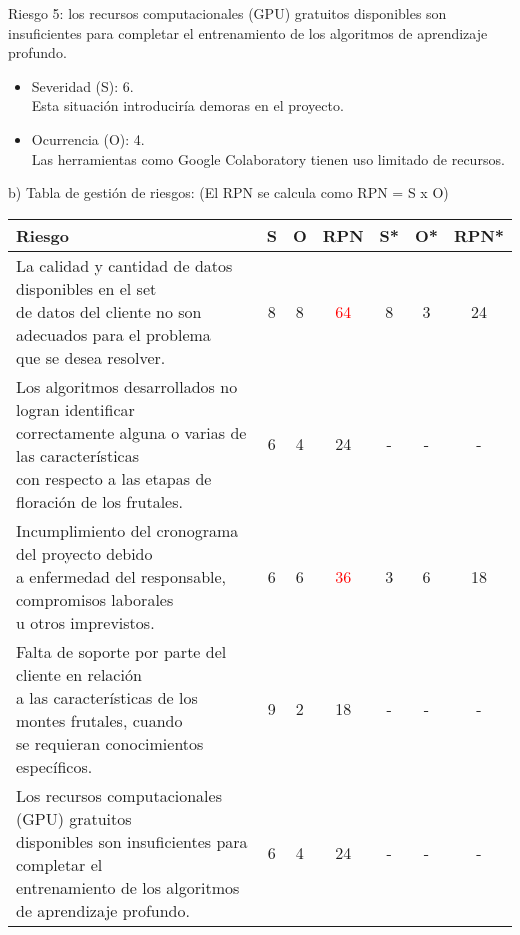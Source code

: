 \documentclass[
11pt, %
]{charter}
\begin{document}
Riesgo 5: los recursos computacionales (GPU) gratuitos disponibles son insuficientes para
completar el entrenamiento de los algoritmos de aprendizaje profundo.
\begin{itemize}
	\item Severidad (S):  6.\\
	Esta situación introduciría demoras en el proyecto.
	\item Ocurrencia (O): 4.\\
	Las herramientas como Google Colaboratory tienen uso limitado de recursos.
\end{itemize}

b) Tabla de gestión de riesgos: (El RPN se calcula como RPN = S x O)

\begin{table}[htpb]
\centering
\begin{tabularx}{\linewidth}{@{}|X|c|c|c|c|c|c|@{}}
\hline
\rowcolor[HTML]{C0C0C0} 
    Riesgo & S & O & RPN & S* & O* & RPN* \\ \hline
    
    \makecell[l]{La calidad y cantidad de datos disponibles en el set \\ de datos del cliente no son adecuados para el problema \\ que se desea resolver.} & 8 & 8 & \textcolor{red}{64} & 8 & 3 & 24 \\ \hline
    
    \makecell[l]{Los algoritmos desarrollados no logran identificar \\ correctamente alguna o varias de las características \\ con respecto a las etapas de floración de los frutales.} & 6 & 4 & 24 & - & - & - \\ \hline
    
    \makecell[l]{Incumplimiento del cronograma del proyecto debido \\ a enfermedad del responsable, compromisos laborales \\ u otros imprevistos.} & 6 & 6 & \textcolor{red}{36}& 3 & 6 & 18 \\ \hline
    
    \makecell[l]{Falta de soporte por parte del cliente en relación \\ a las características de los montes frutales, cuando \\ se requieran conocimientos específicos.} & 9 & 2 & 18 & - & - & - \\ \hline
    
    \makecell[l]{Los recursos computacionales (GPU) gratuitos \\ disponibles son insuficientes para completar el \\ entrenamiento de los algoritmos de aprendizaje profundo.} & 6 & 4 & 24 & - & - & - \\ \hline
\end{tabularx}
\end{table}
\end{document}
